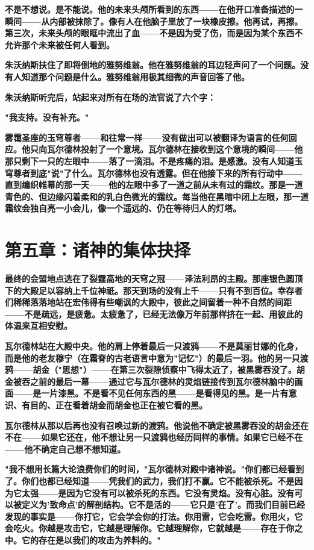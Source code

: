 \documentclass[12pt,a4paper,openany]{ctexbook}
\begin{document}
\textbf{不是不想说。是不能说。他的未来头颅所看到的东西——在他开口准备描述的一瞬间——从内部被抹除了。像有人在他脑子里放了一块橡皮擦。他再试，再擦。第三次，未来头颅的眼眶中流出了血——不是因为受了伤，而是因为某个东西不允许那个未来被任何人看到。}


\textbf{朱沃纳斯扶住了即将倒地的雅努维翁。他在雅努维翁的耳边轻声问了一个问题。没有人知道那个问题是什么。雅努维翁用极其细微的声音回答了他。}


\textbf{朱沃纳斯听完后，站起来对所有在场的法官说了六个字：}


\textbf{"我支持。没有补充。"}


\textbf{雾霭圣座的玉穹尊者——和往常一样——没有做出可以被翻译为语言的任何回应。他只向瓦尔德林投射了一个意境。瓦尔德林在接收到这个意境的瞬间——他那只剩下一只的左眼中——落了一滴泪。不是疼痛的泪。是感激。没有人知道玉穹尊者到底"说"了什么。瓦尔德林也没有透露。但在他接下来的所有行动中——直到编织帷幕的那一天——他的左眼中多了一道之前从未有过的霜纹。那是一道青色的、但边缘闪着柔和的乳白色微光的霜纹。每当他在黑暗中闭上左眼，那一道霜纹会独自亮一小会儿，像一个遥远的、仍在等待归人的灯塔。}


\section*{第五章：诸神的集体抉择}


\textbf{最终的会盟地点选在了裂霆高地的天穹之冠——泽法利昂的主殿。那座银色圆顶下的大殿足以容纳上千位神祇。那天到场的没有上千——只有不到百位。幸存者们稀稀落落地站在宏伟得有些嘲讽的大殿中，彼此之间留着一种不自然的间距——不是疏远，是疲惫。太疲惫了，已经无法像万年前那样挤在一起、用彼此的体温来互相安慰。}


\textbf{瓦尔德林站在大殿中央。他的肩上停着最后一只渡鸦——不是莫丽甘娜的化身，而是他的老友穆宁（在霜脊的古老语言中意为"记忆"）的最后一羽。他的另一只渡鸦——胡金（"思想"）——在第三次裂隙侦察中飞得太近了，被黑雾吞没了。胡金被吞之前的最后一幕——通过它与瓦尔德林的灵焰链接传到瓦尔德林脑中的画面——是一片漆黑。不是看不见任何东西的黑——是看得见的黑。是一片有意识、有目的、正在看着胡金而胡金也正在被它看的黑。}


\textbf{瓦尔德林从那以后再也没有召唤过新的渡鸦。他说他不确定被黑雾吞没的胡金还在不在——如果它还在，他不想让另一只渡鸦也经历同样的事情。如果它已经不在——他不确定自己想不想知道。}


\textbf{"我不想用长篇大论浪费你们的时间，"瓦尔德林对殿中诸神说。"你们都已经看到了。你们也都已经知道——凭我们的武力，我们打不赢。它不能被杀死。不是因为它太强——是因为它没有可以被杀死的东西。它没有灵焰。没有心脏。没有可以被定义为'致命点'的解剖结构。它不是活的——它只是'在了'。而我们目前已经发现的事实是——你打它，它会学会你的打法。你用雷，它会吃雷。你用火，它会吃火。你越是攻击它，它越是理解你。它越理解你，它就越是——存在于你之中。它的存在是以我们的攻击为养料的。"}
\end{document}
